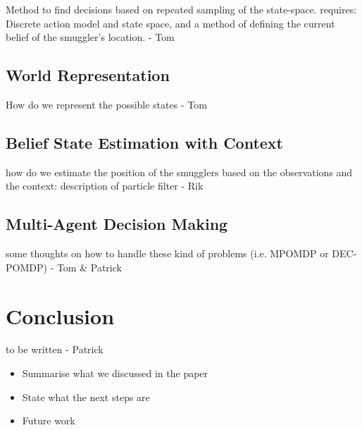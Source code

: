 \documentclass[conference]{IEEEtran}
\begin{document}
{\red Method to find decisions based on repeated sampling of the state-space. requires: Discrete action model and state space, and a method of defining the current belief of the smuggler's location. - Tom}

\subsection{World Representation}

{\red How do we represent the possible states - Tom}

\subsection{Belief State Estimation with Context}

{\red how do we estimate the position of the smugglers based on the observations and the context: description of particle filter - Rik}

\subsection{Multi-Agent Decision Making}

{\red some thoughts on how to handle these kind of problems (i.e. MPOMDP or DEC-POMDP) - Tom \& Patrick}

\section{Conclusion}

{\red to be written - Patrick}

\begin{itemize}
\item Summarise what we discussed in the paper
\item State what the next steps are
\item Future work
\end{itemize}

\end{document}
